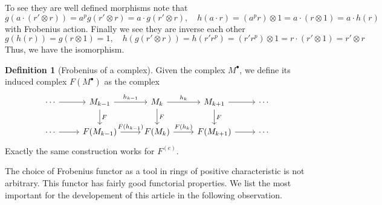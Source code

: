 \documentclass[leqno]{article}
\theoremstyle{definition}
\newtheorem{definition}{Definition}[section]
\begin{document}
To see they are well defined morphisms note that 
\[
g(a \cdot (r'\otimes r)) = a^p g(r'\otimes r) = a\cdot g(r'\otimes r), \quad h(a\cdot r)= (a^pr)\otimes 1 = a\cdot (r \otimes 1) = a \cdot h(r)
\]
with Frobenius action. Finally we see they are inverse each other
\[
g(h(r)) = g(r\otimes 1) = 1, \quad h(g(r'\otimes r)) = h(r'r^p) = (r'r^p)\otimes 1 = r\cdot (r'\otimes 1) = r'\otimes r
\] 
Thus, we have the isomorphism.





\begin{definition}[Frobenius of a complex] Given the complex $M^{\bullet}$, we define its induced complex $F(M^{\bullet})$ as the complex
\[\begin{tikzcd}
	\cdots & {M_{k-1}} & {M_{k}} & {M_{k+1}} & \cdots \\
	\cdots & {F(M_{k-1})} & {F(M_{k})} & {F(M_{k+1})} & \cdots
	\arrow["F", from=1-2, to=2-2]
	\arrow["F", from=1-3, to=2-3]
	\arrow["F", from=1-4, to=2-4]
	\arrow["{h_{k-1}}", from=1-2, to=1-3]
	\arrow["{h_k}", from=1-3, to=1-4]
	\arrow["{F(h_{k-1})}", from=2-2, to=2-3]
	\arrow["{F(h_k)}", from=2-3, to=2-4]
	\arrow[from=1-1, to=1-2]
	\arrow[from=1-4, to=1-5]
	\arrow[from=2-4, to=2-5]
	\arrow[from=2-1, to=2-2]
\end{tikzcd}\]
Exactly the same construction works for $F ^{(e)}$.
\end{definition}

The choice of Frobenius functor as a tool in rings of positive characteristic is not arbitrary. This functor has fairly good functorial properties. We list the most important for the developement of this article in the following observation.
\end{document}
